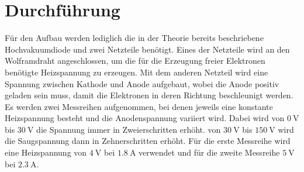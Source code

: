 \section{Durchführung}
\label{sec:Durchführung}

Für den Aufbau werden lediglich die in der Theorie bereits beschriebene Hochvakuumdiode und zwei Netzteile benötigt. Eines der Netzteile wird an 
den Wolframdraht angeschlossen, um die für die Erzeugung freier Elektronen benötigte Heizspannung zu erzeugen. Mit dem anderen Netzteil wird eine 
Spannung zwischen Kathode und Anode aufgebaut, wobei die Anode positiv geladen sein muss, damit die Elektronen in deren Richtung beschleunigt 
werden.\\
Es werden zwei Messreihen aufgenommen, bei denen jeweils eine konstante Heizspannung besteht und die Anodenspannung variiert wird. 
Dabei wird von $\SI{0}{\volt} $ bis $\SI{30}{\volt} $ die Spannung immer in Zweierschritten erhöht. von $\SI{30}{\volt} $ bis 
$\SI{150}{\volt} $ wird die Saugspannung dann in Zehnerschritten erhöht. Für die erste Messreihe wird eine Heizspannung von 
$\SI{4}{\volt} $ bei $\SI{1.8}{\ampere} $ verwendet und für die zweite Messreihe $\SI{5}{\volt} $ bei $\SI{2.3}{\ampere} $.
